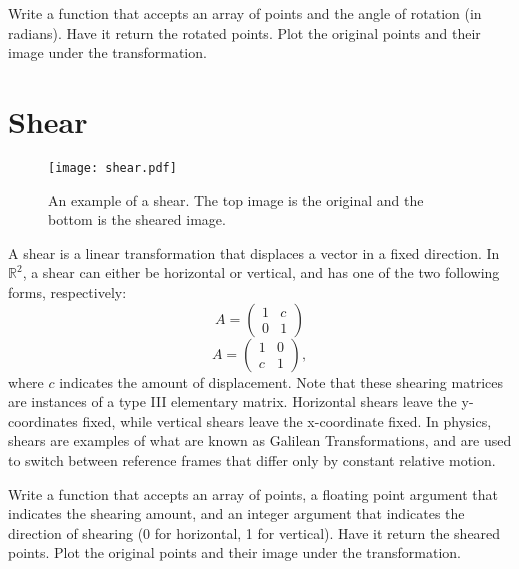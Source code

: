 \begin{problem}
Write a function that accepts an array of points and the angle of rotation (in
radians). Have it return the rotated points.
Plot the original points and their image under the transformation.
\end{problem}

\section*{Shear}

\begin{figure}
\centering
\texttt{[image: shear.pdf]}
\caption{An example of a shear.
The top image is the original and the bottom is the sheared image.}
\label{basis:shear}
\end{figure}

A shear is a linear transformation that displaces a vector in a fixed direction.
In $\mathbb{R}^2$, a shear can either be horizontal or vertical, and has one of
the two following forms, respectively:
\[
A = \begin{pmatrix}
1 & c \\
0 & 1
\end{pmatrix}
\]
\[
A = \begin{pmatrix}
1 & 0 \\
c & 1
\end{pmatrix},
\]
where $c$ indicates the amount of displacement.  Note that
these shearing matrices are instances of a type III elementary matrix. Horizontal
shears leave the y-coordinates fixed, while vertical shears leave the x-coordinate
fixed. In physics, shears are examples of what are known as Galilean Transformations, and are used
to switch between reference frames that differ only by constant relative motion.

\begin{problem}
Write a function that accepts an array of points, a floating point argument that
indicates the shearing amount, and an integer argument
that indicates the direction of shearing (0 for horizontal, 1 for vertical).
Have it return the sheared points.
Plot the original points and their image under the transformation.
\end{problem}

